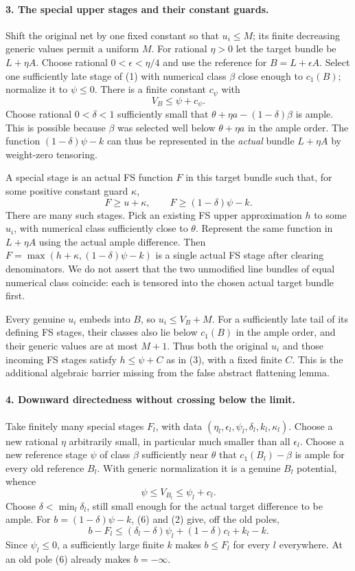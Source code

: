 \documentclass[10pt]{article}
\begin{document}
\paragraph{3. The special upper stages and their constant guards.}
Shift the original net by one fixed constant so that $u_i\le M$;
its finite decreasing generic values permit a uniform $M$.
For rational $\eta>0$ let the target bundle be $L+\eta A$.
Choose rational $0<\epsilon<\eta/4$ and use the reference for
$B=L+\epsilon A$. Select one sufficiently late stage of (1) with
numerical class $\beta$ close enough to $c_1(B)$; normalize it to
$\psi\le0$. There is a finite constant $c_\psi$ with
\[
 V_B\le\psi+c_\psi.                                    \tag{4}
\]
Choose rational $0<\delta<1$ sufficiently small that
$\theta+\eta a-(1-\delta)\beta$ is ample. This is possible because
$\beta$ was selected well below $\theta+\eta a$ in the ample order.
The function $(1-\delta)\psi-k$ can thus be represented in the
\emph{actual} bundle $L+\eta A$ by weight-zero tensoring.

A special stage is an actual FS function $F$ in this target bundle
such that, for some positive constant guard $\kappa$,
\[
 F\ge u+\kappa,\qquad F\ge(1-\delta)\psi-k.              \tag{5}
\]
There are many such stages. Pick an existing FS upper approximation
$h$ to some $u_i$, with numerical class sufficiently close to $\theta$.
Represent the same function in $L+\eta A$ using the actual ample
difference. Then $F=\max(h+\kappa,(1-\delta)\psi-k)$ is a single
actual FS stage after clearing denominators. We do not assert that
the two unmodified line bundles of equal numerical class coincide:
each is tensored into the chosen actual target bundle first.

Every genuine $u_i$ embeds into $B$, so $u_i\le V_B+M$.
For a sufficiently late tail of its defining FS stages, their classes
also lie below $c_1(B)$ in the ample order, and their generic values
are at most $M+1$. Thus both the original $u_i$ and those incoming
FS stages satisfy $h\le\psi+C$ as in (3), with a fixed finite $C$.
This is the additional algebraic barrier missing from the false
abstract flattening lemma.

\paragraph{4. Downward directedness without crossing below the limit.}
Take finitely many special stages $F_l$, with data
$(\eta_l,\epsilon_l,\psi_l,\delta_l,k_l,\kappa_l)$.
Choose a new rational $\eta$ arbitrarily small, in particular much
smaller than all $\epsilon_l$. Choose a new reference stage $\psi$
of class $\beta$ sufficiently near $\theta$ that
$c_1(B_l)-\beta$ is ample for every old reference $B_l$.
With generic normalization it is a genuine $B_l$ potential, whence
\[
 \psi\le V_{B_l}\le\psi_l+c_l.                           \tag{6}
\]
Choose $\delta<\min_l\delta_l$, still small enough for the actual
target difference to be ample. For $b=(1-\delta)\psi-k$, (6) and (2)
give, off the old poles,
\[
 b-F_l\le(\delta_l-\delta)\psi_l
             +(1-\delta)c_l+k_l-k.                      \tag{7}
\]
Since $\psi_l\le0$, a sufficiently large finite $k$ makes $b\le F_l$
for every $l$ everywhere. At an old pole (6) already makes $b=-\infty$.
\end{document}
